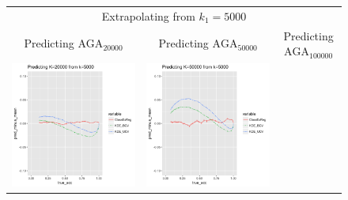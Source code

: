 \documentclass[twoside,11pt]{article}
\newenvironment{myfont}{\fontfamily{phv}\selectfont}{\par}
\begin{document}
\begin{figure}[p]
\begin{tabular}{ccc}
\multicolumn{3}{c}{\begin{myfont}Extrapolating from $k_1 = 5000$\end{myfont}}\\
\begin{myfont}Predicting $\text{AGA}_{20000}$\end{myfont} &
\begin{myfont}Predicting $\text{AGA}_{50000}$\end{myfont} &
\begin{myfont}Predicting $\text{AGA}_{100000}$\end{myfont}\\
\includegraphics[scale = 0.45, clip = true, trim = .22in 0 1.23in 0.4in]{sim_large7_biaz_K20_k5.png} &
\includegraphics[scale = 0.45, clip = true, trim = .3in 0 1.23in 0.4in]{sim_large7_biaz_K50_k5.png} &

\end{tabular}
\end{figure}
\end{document}
